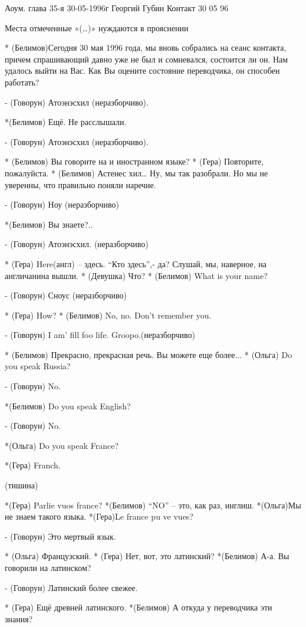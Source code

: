 Аоум. глава 35-я 30-05-1996г
Георгий Губин
Контакт 30 05 96


Места отмеченные «(…)» 
нуждаются в прояснении  

* (Белимов)Сегодня 30 мая 1996 года, мы вновь собрались на сеанс контакта, причем спрашивающий давно уже не был и сомневался, состоится ли он. Нам удалось выйти на Вас. Как Вы оцените состояние переводчика, он способен работать?

- (Говорун) Атоэнэсхил (неразборчиво).

*(Белимов) Ещё. Не расслышали.

- (Говорун) Атоэнэсхил (неразборчиво).

* (Белимов) Вы говорите на и иностранном языке?
* (Гера) Повторите, пожалуйста.
* (Белимов)  Астенес хил… Ну, мы так разобрали. Но мы не уверенны, что правильно поняли наречие.

- (Говорун) Ноу (неразборчиво)

*(Белимов) Вы знаете?..

- (Говорун) Атоэнэсхил. (неразборчиво)

* (Гера) Here(англ) – здесь. “Кто здесь”,- да? Слушай, мы, наверное, на англичанина вышли.
* (Девушка) Что?
* (Белимов) What  is your name?

- (Говорун) Сноус (неразборчиво)

* (Гера) How?
* (Белимов) No, no. Don't remember you.

- (Говорун) I am’ fill foo life. Groopo.(неразборчиво)

* (Белимов) Прекрасно, прекрасная речь. Вы можете еще более...
* (Ольга) Do you speak Russia?

- (Говорун) No.

*(Белимов) Do you speak English?

- (Говорун) No.

*(Ольга) Do you speak France?

*(Гера) Franch.

(тишина)

*(Гера) Parlie vuos france?
 *(Белимов) “NO” – это, как раз, инглиш.
*(Ольга)Мы не знаем такого языка.
*(Гера)Le france pu ve vues?

- (Говорун) Это мертвый язык.

* (Ольга) Французский.
* (Гера) Нет, вот, это латинский?
*(Белимов) А-а. Вы говорили на латинском?

- (Говорун) Латинский более свежее.

* (Гера) Ещё древней латинского.
*(Белимов) А откуда у переводчика эти знания?


